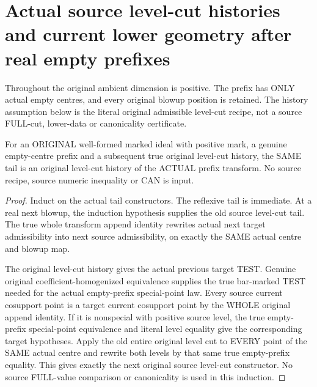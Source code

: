 \section{Actual source level-cut histories and current lower geometry after real empty prefixes}

Throughout the original ambient dimension is positive. The prefix has
ONLY actual empty centres, and every original blowup position is retained.
The history assumption below is the literal original admissible level-cut
recipe, not a source FULL-cut, lower-data or canonicality certificate.

\begin{lemma}
\label{hir:original-empty-prefix-level-cut-tail-transport}
\leanok
For an ORIGINAL well-formed marked ideal with positive mark, a genuine
empty-centre prefix and a subsequent true original level-cut history,
the SAME tail is an original level-cut history of the ACTUAL prefix
transform. No source recipe, source numeric inequality or CAN is input.
\end{lemma}
\begin{proof}
Induct on the actual tail constructors. The reflexive tail is immediate.
At a real next blowup, the induction hypothesis supplies the old source
level-cut tail. The true whole transform append identity rewrites actual
next target admissibility into next source admissibility, on exactly
the SAME actual centre and blowup map.

The original level-cut history gives the actual previous target TEST.
Genuine original coefficient-homogenized equivalence supplies the true
bar-marked TEST needed for the actual empty-prefix special-point law.
Every source current cosupport point is a target current cosupport point
by the WHOLE original append identity. If it is nonspecial with positive
source level, the true empty-prefix special-point equivalence and literal
level equality give the corresponding target hypotheses. Apply the old
entire original level cut to EVERY point of the SAME actual centre and
rewrite both levels by that same true empty-prefix equality. This gives
exactly the next original source level-cut constructor. No source
FULL-value comparison or canonicality is used in this induction.
\end{proof}

